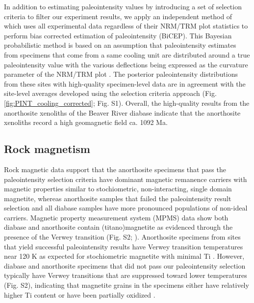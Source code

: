 \documentclass[9pt,twocolumn,twoside,lineno]{pnas-new}
\begin{document}
In addition to estimating paleointensity values by introducing a set of selection criteria to filter our experiment results, we apply an independent method of \citealp{Cych2021a} which uses all experimental data regardless of their NRM/TRM plot statistics to perform bias corrected estimation of paleointensity (BiCEP). This Bayesian probabilistic method is based on an assumption that paleointensity estimates from specimens that come from a same cooling unit are distributed around a true paleointensity value with the various deflections being expressed as the curvature parameter of the NRM/TRM plot \cite{Paterson2011a}. The posterior paleointensity distributions from these sites with high-quality specimen-level data are in agreement with the site-level averages developed using the selection criteria approach (Fig. \ref{fig:PINT_cooling_corrected}; Fig. S1). Overall, the high-quality results from the anorthosite xenoliths of the Beaver River diabase indicate that the anorthosite xenoliths record a high geomagnetic field ca. 1092 Ma. 

\subsection*{Rock magnetism}

Rock magnetic data support that the anorthosite specimens that pass the paleointensity selection criteria have dominant magnetic remanence carriers with magnetic properties similar to stochiometric, non-interacting, single domain magnetite, whereas anorthosite samples that failed the paleointensity result selection and all diabase samples have more pronounced populations of non-ideal carriers. Magnetic property measurement system (MPMS) data show both diabase and anorthosite contain (titano)magnetite as evidenced through the presence of the Verwey transition (Fig. S2;  \citealp{Verwey1939a, Feinberg2015a}). Anorthosite specimens from sites that yield successful paleointensity results have Verwey transition temperatures near 120 K as expected for stochiometric magnetite with minimal Ti \cite{Ozdemir1993a}. However, diabase and anorthosite specimens that did not pass our paleointensity selection typically have Verwey transitions that are suppressed toward lower temperatures (Fig. S2), indicating that magnetite grains in the specimens either have relatively higher Ti content or have been partially oxidized \cite{Ozdemir1993a}. 
 
\end{document}
